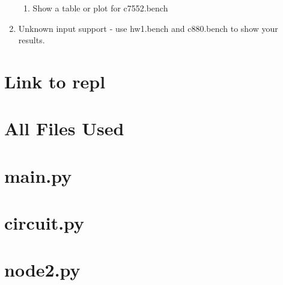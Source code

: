 \documentclass{article}
\begin{document}
\begin{enumerate}[label=\Alph*.]
\begin{enumerate}[label=\roman*.]
                \item Show a table or plot for c7552.bench
                
            \end{enumerate}
            
            \item Unknown input support - use hw1.bench and c880.bench to show your results.
        \end{enumerate}

    \section{Link to repl}
    
    \newpage
    \section{All Files Used}
        \newcommand{\FileUsed}[1]{\section*{ #1 }}
        \FileUsed{main.py}
        \FileUsed{circuit.py}
        \FileUsed{node2.py}
\end{document}
